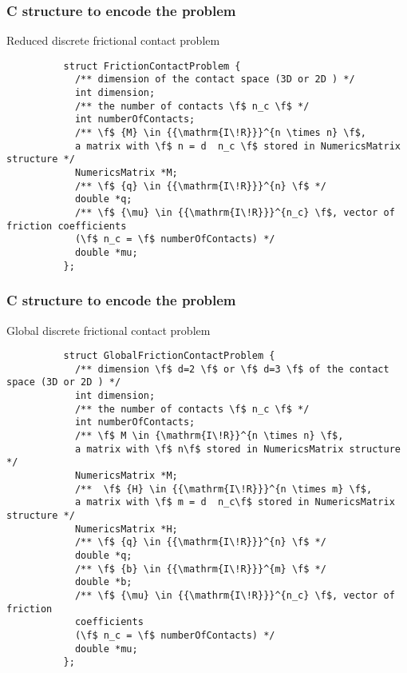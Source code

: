   
\begin{frame}[fragile]
  \frametitle{C structure to encode the problem} 
  {
    \begin{block}{Reduced discrete frictional contact problem}
      {\small
        \begin{verbatim}
          struct FrictionContactProblem {
            /** dimension of the contact space (3D or 2D ) */
            int dimension;
            /** the number of contacts \f$ n_c \f$ */
            int numberOfContacts;
            /** \f$ {M} \in {{\mathrm{I\!R}}}^{n \times n} \f$,
            a matrix with \f$ n = d  n_c \f$ stored in NumericsMatrix structure */
            NumericsMatrix *M;
            /** \f$ {q} \in {{\mathrm{I\!R}}}^{n} \f$ */
            double *q;
            /** \f$ {\mu} \in {{\mathrm{I\!R}}}^{n_c} \f$, vector of friction coefficients
            (\f$ n_c = \f$ numberOfContacts) */
            double *mu;
          };
        \end{verbatim}
      }
    \end{block}
  }
\end{frame}
\begin{frame}[fragile]
  \frametitle{C structure to encode the problem}
  {
    \begin{block}{Global discrete frictional contact problem}
      {\small
        \begin{verbatim}
          struct GlobalFrictionContactProblem {
            /** dimension \f$ d=2 \f$ or \f$ d=3 \f$ of the contact space (3D or 2D ) */
            int dimension;
            /** the number of contacts \f$ n_c \f$ */
            int numberOfContacts;
            /** \f$ M \in {\mathrm{I\!R}}^{n \times n} \f$,
            a matrix with \f$ n\f$ stored in NumericsMatrix structure */
            NumericsMatrix *M;
            /**  \f$ {H} \in {{\mathrm{I\!R}}}^{n \times m} \f$,
            a matrix with \f$ m = d  n_c\f$ stored in NumericsMatrix structure */
            NumericsMatrix *H;
            /** \f$ {q} \in {{\mathrm{I\!R}}}^{n} \f$ */
            double *q;
            /** \f$ {b} \in {{\mathrm{I\!R}}}^{m} \f$ */
            double *b;
            /** \f$ {\mu} \in {{\mathrm{I\!R}}}^{n_c} \f$, vector of friction
            coefficients
            (\f$ n_c = \f$ numberOfContacts) */
            double *mu;
          };
        \end{verbatim}
      }
    \end{block}
  }
\end{frame}

